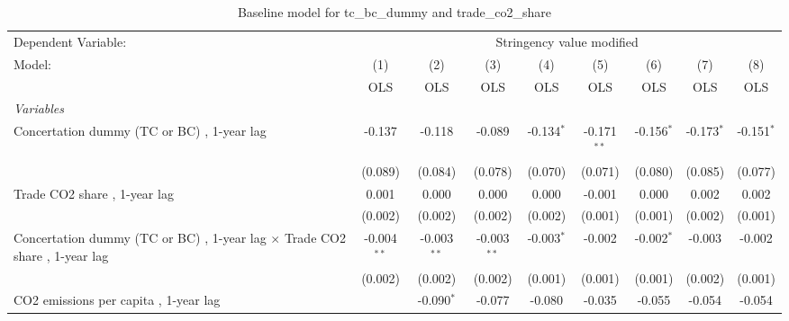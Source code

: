
\begin{table}[htbp]
   \caption{Baseline model for tc\_bc\_dummy and trade\_co2\_share}
   \centering
   \begin{tabular}{lcccccccc}
      \toprule
      Dependent Variable: & \multicolumn{8}{c}{Stringency value modified}\\
      Model:                                                                            & (1)           & (2)           & (3)           & (4)          & (5)           & (6)           & (7)           & (8)\\  
                                                                                        &  OLS          & OLS           & OLS           & OLS          & OLS           & OLS           & OLS           & OLS\\  
      \midrule
      \emph{Variables}\\
      Concertation dummy (TC or BC) , 1-year lag                                        & -0.137        & -0.118        & -0.089        & -0.134$^{*}$ & -0.171$^{**}$ & -0.156$^{*}$  & -0.173$^{*}$  & -0.151$^{*}$\\   
                                                                                        & (0.089)       & (0.084)       & (0.078)       & (0.070)      & (0.071)       & (0.080)       & (0.085)       & (0.077)\\   
      Trade CO2 share , 1-year lag                                                      & 0.001         & 0.000         & 0.000         & 0.000        & -0.001        & 0.000         & 0.002         & 0.002\\   
                                                                                        & (0.002)       & (0.002)       & (0.002)       & (0.002)      & (0.001)       & (0.001)       & (0.002)       & (0.001)\\   
      Concertation dummy (TC or BC) , 1-year lag $\times$ Trade CO2 share , 1-year lag  & -0.004$^{**}$ & -0.003$^{**}$ & -0.003$^{**}$ & -0.003$^{*}$ & -0.002        & -0.002$^{*}$  & -0.003        & -0.002\\   
                                                                                        & (0.002)       & (0.002)       & (0.002)       & (0.001)      & (0.001)       & (0.001)       & (0.002)       & (0.001)\\   
      CO2 emissions per capita , 1-year lag                                             &               & -0.090$^{*}$  & -0.077        & -0.080       & -0.035        & -0.055        & -0.054        & -0.054\\   

\end{tabular}
\end{table}
